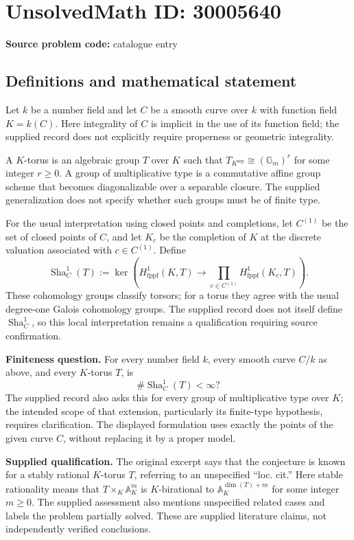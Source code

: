 \documentclass[11pt]{article}
\begin{document}
\section*{UnsolvedMath ID: 30005640}
\textbf{Source problem code:} catalogue entry
\subsection{Definitions and mathematical statement}
Let \(k\) be a number field and let \(C\) be a smooth curve over \(k\) with function field \(K=k(C)\). Here integrality of \(C\) is implicit in the use of its function field; the supplied record does not explicitly require properness or geometric integrality.

A \(K\)-torus is an algebraic group \(T\) over \(K\) such that \(T_{K^{\mathrm{sep}}}\cong(\mathbb G_m)^r\) for some integer \(r\geq 0\). A group of multiplicative type is a commutative affine group scheme that becomes diagonalizable over a separable closure. The supplied generalization does not specify whether such groups must be of finite type.

For the usual interpretation using closed points and completions, let \(C^{(1)}\) be the set of closed points of \(C\), and let \(K_c\) be the completion of \(K\) at the discrete valuation associated with \(c\in C^{(1)}\). Define
\[
\operatorname{Sha}_C^1(T)
:=\ker\!\left(H^1_{\mathrm{fppf}}(K,T)
\longrightarrow\prod_{c\in C^{(1)}}H^1_{\mathrm{fppf}}(K_c,T)\right).
\]
These cohomology groups classify torsors; for a torus they agree with the usual degree-one Galois cohomology groups. The supplied record does not itself define \(\operatorname{Sha}_C^1\), so this local interpretation remains a qualification requiring source confirmation.

\textbf{Finiteness question.} For every number field \(k\), every smooth curve \(C/k\) as above, and every \(K\)-torus \(T\), is
\[
\#\operatorname{Sha}_C^1(T)<\infty?
\]
The supplied record also asks this for every group of multiplicative type over \(K\); the intended scope of that extension, particularly its finite-type hypothesis, requires clarification. The displayed formulation uses exactly the points of the given curve \(C\), without replacing it by a proper model.

\textbf{Supplied qualification.} The original excerpt says that the conjecture is known for a stably rational \(K\)-torus \(T\), referring to an unspecified ``loc. cit.'' Here stable rationality means that \(T\times_K\mathbb A_K^m\) is \(K\)-birational to \(\mathbb A_K^{\dim(T)+m}\) for some integer \(m\geq0\). The supplied assessment also mentions unspecified related cases and labels the problem partially solved. These are supplied literature claims, not independently verified conclusions.
\end{document}
